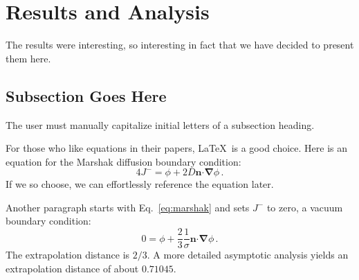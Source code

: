\documentclass{anstrans}
\renewcommand{\vec}[1]{\bm{#1}} %
\newcommand{\vd}{\bm{\cdot}} %
\newcommand{\grad}{\vec{\nabla}} %
\begin{document}
\section{Results and Analysis}
The results were interesting, so interesting in fact that we have decided to
present them here.

\subsection{Subsection Goes Here}
The user must manually capitalize initial letters of a subsection heading.

For those who like equations in their papers, \LaTeX\ is a good choice. Here is
an equation for the Marshak diffusion boundary condition:
\begin{equation} \label{eq:marshak}
  4 J^- = \phi + 2 D \vec{n} \vd \grad \phi \,.
\end{equation}
If we so choose, we can effortlessly reference the equation later.

Another paragraph starts with Eq.~\eqref{eq:marshak} and sets $J^-$ to zero, a
vacuum boundary condition:
\begin{equation*}
  0 = \phi + \frac{2}{3} \frac{1}{\sigma} \vec{n} \vd \grad \phi \,.
\end{equation*}
The extrapolation distance is $2/3$. A more detailed asymptotic analysis yields
an extrapolation distance of about $0.71045$.
\end{document}
